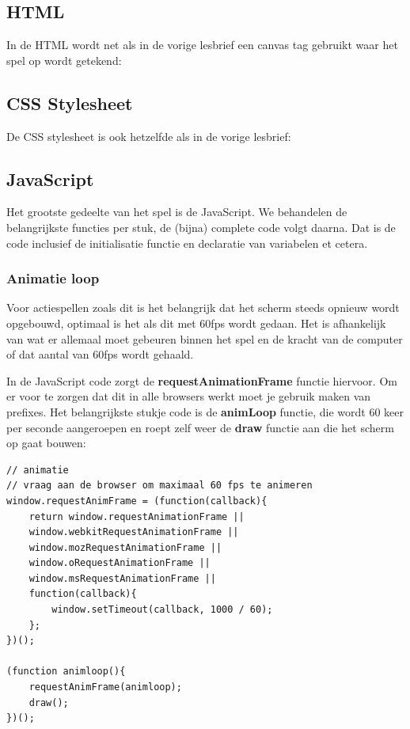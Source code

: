 \documentclass[a4paper]{report}
\begin{document}
\subsection*{HTML}
In de HTML wordt net als in de vorige lesbrief een canvas tag gebruikt waar het spel op wordt getekend: 



\subsection*{CSS Stylesheet}
\noindent De CSS stylesheet is ook hetzelfde als in de vorige lesbrief:



\subsection*{JavaScript}
\noindent Het grootste gedeelte van het spel is de JavaScript. We behandelen de belangrijkste functies per stuk, de (bijna) complete code volgt daarna. Dat is de code inclusief de initialisatie functie en declaratie van variabelen et cetera.

\subsubsection*{Animatie loop}
Voor actiespellen zoals dit is het belangrijk dat het scherm steeds opnieuw wordt opgebouwd, optimaal is het als dit met 60fps wordt gedaan. Het is afhankelijk van wat er allemaal moet gebeuren binnen het spel en de kracht van de computer of dat aantal van 60fps wordt gehaald. 

In de JavaScript code zorgt de \textbf{requestAnimationFrame} functie hiervoor. Om er voor te zorgen dat dit in alle browsers werkt moet je gebruik maken van prefixes. Het belangrijkste stukje code is de \textbf{animLoop} functie, die wordt 60 keer per seconde aangeroepen en roept zelf weer de \textbf{draw} functie aan die het scherm op gaat bouwen:

\begin{lstlisting}[numbers=none]
// animatie
// vraag aan de browser om maximaal 60 fps te animeren
window.requestAnimFrame = (function(callback){
	return window.requestAnimationFrame ||
	window.webkitRequestAnimationFrame ||
	window.mozRequestAnimationFrame ||
	window.oRequestAnimationFrame ||
	window.msRequestAnimationFrame ||
	function(callback){
		window.setTimeout(callback, 1000 / 60);
	};
})();

(function animloop(){
	requestAnimFrame(animloop);
	draw();
})();
\end{lstlisting}
\end{document}
